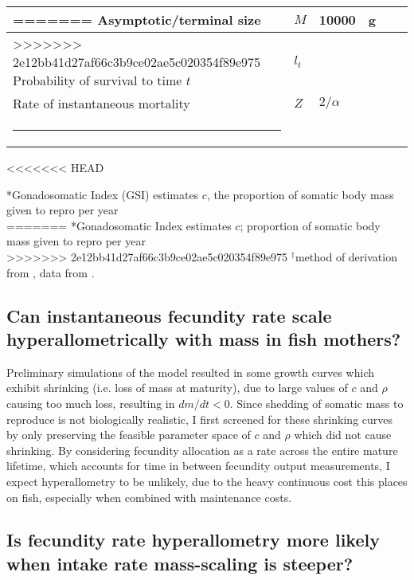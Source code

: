 \documentclass[a4paper]{article} %
\makeatletter
\newcommand{\thickhline}{%
    \noalign {\ifnum 0=`}\fi \hrule height 1pt
    \futurelet \reserved@a \@xhline
}
\makeatother
\begin{document}
\begin{center}
\begin{minipage}{\linewidth}
\begin{table}[h]
\begin{tabularx}{\linewidth}{Xlllll}
=======
    Asymptotic/terminal size                                & $M$                   & 10000              & g                     &                                   &                       \\ \hline
>>>>>>> 2e12bb41d27af66c3b9ce02ae5c020354f89e975
    Probability of survival to time $t$                     & $l_t$                 &                           & \textsc{}             &                                   &                       \\ \hline
    Rate of instantaneous mortality                         & $Z$                   & $2/\alpha$                &                       &                                   &                       \\ \thickhline
    \end{tabularx}
    \label{parameters}
\end{table}
<<<<<<< HEAD

*Gonadosomatic Index (GSI) estimates $c$, the proportion of somatic body mass given to repro per year\\
=======
*Gonadosomatic Index estimates $c$; proportion of somatic body mass given to repro per year\\
>>>>>>> 2e12bb41d27af66c3b9ce02ae5c020354f89e975
$^{\dagger}$method of derivation from \textcite{West2001}, data from \textcite{Cummins1971, Steimle1980}.
\subsection{Can instantaneous fecundity rate scale hyperallometrically with mass in fish mothers?}

Preliminary simulations of the model resulted in some growth curves which exhibit shrinking (i.e. loss of mass at maturity), due to large values of $c$ and $\rho$ causing too much loss, resulting in $dm/dt < 0$. Since shedding of somatic mass to reproduce is not biologically realistic, I first screened for these shrinking curves by only preserving the feasible parameter space of $c$ and $\rho$ which did not cause shrinking.
By considering fecundity allocation as a rate across the entire mature lifetime, which accounts for time in between fecundity output measurements, I expect hyperallometry to be unlikely, due to the heavy continuous cost this places on fish, especially when combined with maintenance costs.

\subsection{Is fecundity rate hyperallometry more likely when intake rate mass-scaling is steeper?}


\end{minipage}
\end{center}
\end{document}
